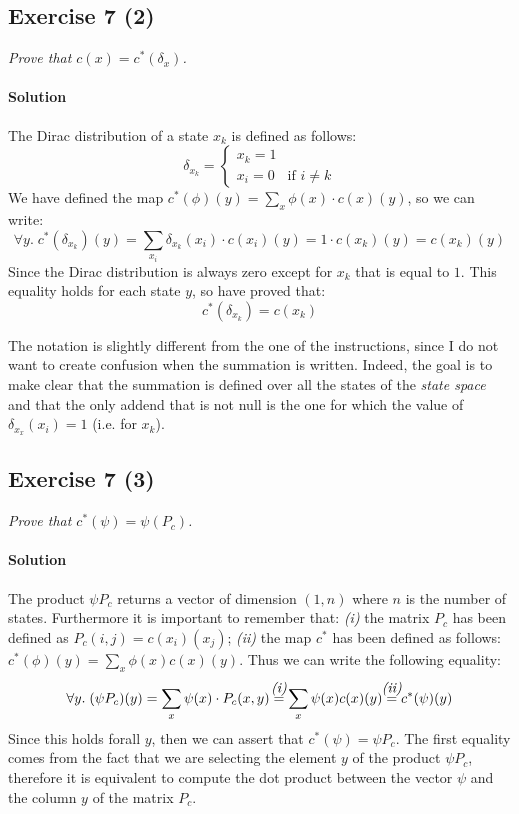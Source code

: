 \subsection*{Exercise 7 (2)}
\textit{Prove that $ c(x) = c^{*}(\delta_{x}) $.}

\paragraph{Solution}
The Dirac distribution of a state $x_{k}$ is defined as follows:
\[ \delta_{x_{k}} = 
    \begin{cases}
        x_{k} = 1 \\
        x_{i} = 0 & \text{if } i \neq k
    \end{cases}
\]
We have defined the map $c^{*}(\phi)(y) = \sum_{x} \phi(x) \cdot c(x)(y)$, so we can write:
\[ \forall y.\;c^{*}(\delta_{x_{k}})(y) = \sum_{x_{i}} \delta_{x_{k}}(x_{i}) \cdot c(x_{i})(y) = 1 \cdot c(x_{k})(y) = c(x_{k})(y) \]
Since the Dirac distribution is always zero except for $x_{k}$ that is equal to $1$.
This equality holds for each state $y$, so have proved that:
\[ c^{*}(\delta_{x_{k}}) = c(x_{k}) \]

The notation is slightly different from the one of the instructions, since I do not want to create confusion when the summation is
written. Indeed, the goal is to make clear that the summation is defined over all the states of the \textit{state space} and that
the only addend that is not null is the one for which the value of $\delta_{x_{x}}(x_{i}) = 1$ (i.e. for $x_{k}$).

\clearpage
\subsection*{Exercise 7 (3)}
\textit{Prove that $ c^{*}(\psi) = \psi(P_{c}) $.}

\paragraph{Solution}
The product $\psi P_{c}$ returns a vector of dimension $(1, n)$ where $n$ is the number of states. 
Furthermore it is important to remember that: \textit{(i)} the matrix $ P_{c} $ has been defined as $ P_{c}(i, j) = c(x_{i})(x_{j}) $;
\textit{(ii)} the map $c^{*}$ has been defined as follows: $ c^{*}(\phi)(y) = \sum_{x} \phi(x) c(x)(y) $.
Thus we can write the following equality:
\[ \forall y.\;(\psi P_{c})(y) = \sum_{x} \psi(x) \cdot P_{c}(x, y) \forone \sum_{x} \psi(x) c(x)(y) \fortwo c^{*}(\psi)(y) \]
Since this holds forall $y$, then we can assert that $c^{*}(\psi) = \psi P_{c}$.
The first equality comes from the fact that we are selecting the element $y$ of the product $\psi P_{c}$, therefore it is
equivalent to compute the dot product between the vector $\psi$ and the column $y$ of the matrix $P_{c}$.


